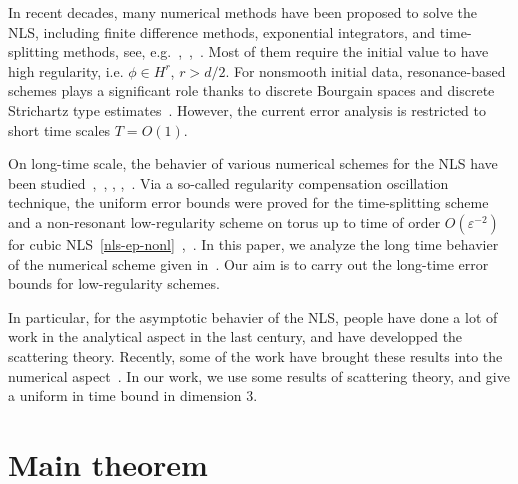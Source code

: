 \documentclass[10pt,a4paper]{article}
\begin{document}
  In recent decades, many numerical methods have been proposed to solve the NLS,
  including finite difference methods, exponential integrators, and time-splitting 
  methods, see, e.g.~\cite{BDD02},~\cite{Lub08},~\cite{Tha12}.
  Most of them require the initial value to have high regularity, i.e. \(\phi
  \in H^r\), \(r>d/2\). For nonsmooth initial data, resonance-based schemes plays
  a significant role thanks to discrete Bourgain spaces and discrete Strichartz
  type estimates~\cite{ORS21}. However, the current error analysis is restricted to
  short time scales \(T=O(1)\). 

  On long-time scale, the behavier of various
  numerical schemes for the NLS have been 
  studied~\cite{CCMM15},~\cite{FGP10}, \cite{FGP10b}, \cite{GL10},~\cite{GL10b}. 
  Via a so-called regularity compensation oscillation technique, the uniform
  error bounds were proved for the time-splitting scheme and a non-resonant
  low-regularity scheme on torus up to time of order \(O(\varepsilon^{-2})\) for cubic
  NLS~\eqref{nls-ep-nonl}~\cite{BCF},~\cite{FMS23}.
  In this paper, we analyze the long time behavier of the numerical scheme
  given in~\cite{ORS21}.
  Our aim is to carry out the long-time error bounds for low-regularity
  schemes. 

  In particular, for the asymptotic behavier of the NLS, people have
  done a lot of work in the analytical aspect in the last century, and
  have developped the scattering theory. Recently,
  some of the work have brought these results into the numerical aspect~\cite{CS22}. In our
  work, we use some results of scattering theory, and give a uniform in time
  bound in dimension \(3\).

  \section{Main theorem}
\end{document}
